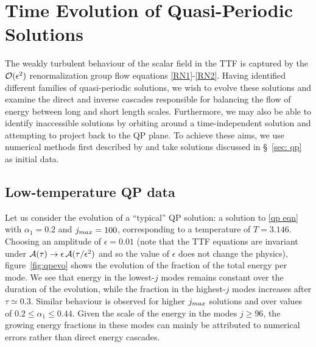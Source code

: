 \documentclass[../PhD.tex]{subfiles}
\begin{document}


\section{Time Evolution of Quasi-Periodic Solutions}
\label{sec: time evolution}

The weakly turbulent behaviour of the scalar field in the TTF is captured by the $\mathcal O(\epsilon^2)$ renormalization group flow equations {\eqref{RN1}-\eqref{RN2}}. Having identified different families of quasi-periodic solutions, we wish to evolve these solutions and examine the direct and inverse cascades responsible for balancing the flow of energy between long and short length scales. Furthermore, we may also be able to identify inaccessible solutions by orbiting around a time-independent solution and attempting to project back to the QP plane. To achieve these aims, we use numerical methods first described by \cite{1606.02712} and take solutions discussed in \S\!~\ref{sec: qp} as initial data. 


\subsection{Low-temperature QP data}

Let us consider the evolution of a ``typical'' QP solution: a solution to \eqref{qp eqn} with $\alpha_1 = 0.2$ and $j_{max} = 100$, corresponding to a temperature of $T = 3.146$. Choosing an amplitude of $\epsilon = 0.01$ (note that the TTF equations are invariant under $\mathcal A(\tau) \to \epsilon \, \mathcal A(\tau / \epsilon^2)$ and so the value of $\epsilon$ does not change the physics), figure~\ref{fig:qpevo} shows the evolution of the fraction of the total energy per mode. We see that energy in the lowest-$j$ modes remains constant over the duration of the evolution, while the fraction in the highest-$j$ modes increases after $\tau \simeq 0.3$. Similar behaviour is observed for higher $j_{max}$ solutions and over values of $0.2 \leq \alpha_1 \leq 0.44$. Given the scale of the energy in the modes $j \geq 96$, the growing energy fractions in these modes can mainly be attributed to numerical errors rather than direct energy cascades.
\end{document}
